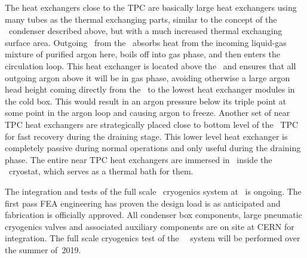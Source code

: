 The heat exchangers close to the TPC are basically large heat exchangers using many tubes as the thermal exchanging parts, similar to the concept of the \LAr\ condenser described above, but with a much increased thermal exchanging surface area.  Outgoing \LAr\ from the \LArTPC\ absorbs heat from the incoming liquid-gas mixture of purified argon here, boils off into gas phase, and then enters the circulation loop.  This heat exchanger is located above the \LArTPC\ and ensures that all outgoing argon above it will be in gas phase, avoiding otherwise a large argon head height coming directly from the \LArTPC\ to the lowest heat exchanger modules in the cold box.  This would result in an argon pressure below its triple point at some point in the argon loop and causing argon to freeze.  Another set of near TPC heat exchangers are strategically placed close to bottom level of the \UAr\ TPC for fast recovery during the draining stage. This lower level heat exchanger is completely passive during normal operations and only useful during the draining phase. The entire near TPC heat exchangers are immersed in \LAr\ inside the \pDUNE\ cryostat, which serves as a thermal bath for them.

The integration and tests of the full scale \UAr\ cryogenics system at \CERN\ is ongoing. The first pass FEA engineering has proven the design load is as anticipated and fabrication is officially approved. All condenser box components, large pneumatic cryogenics valves and associated auxiliary components are on site at CERN for integration. The full scale cryogenics test of the \DSk\ \UAr\ system will be performed over the summer of~2019.